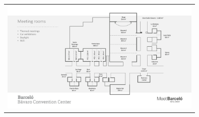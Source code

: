 
\thispagestyle{empty}
\begin{center}
  \begin{tabular}{r}
    \includegraphics[width=3.8in]{content/2021-EMNLP-Bavaro-Floorplan.pdf} \\
  \end{tabular}
\end{center}
